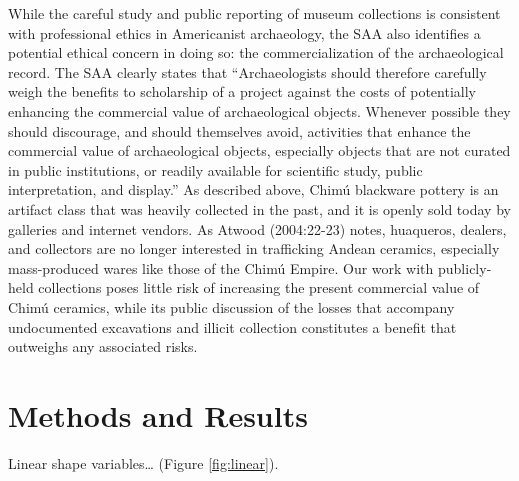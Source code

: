 \documentclass[]{interact}
\theoremstyle{plain}%
\theoremstyle{definition}
\theoremstyle{remark}
\begin{document}
While the careful study and public reporting of museum collections is
consistent with professional ethics in Americanist archaeology, the SAA
also identifies a potential ethical concern in doing so: the
commercialization of the archaeological record. The SAA clearly states
that ``Archaeologists should therefore carefully weigh the benefits to
scholarship of a project against the costs of potentially enhancing the
commercial value of archaeological objects. Whenever possible they
should discourage, and should themselves avoid, activities that enhance
the commercial value of archaeological objects, especially objects that
are not curated in public institutions, or readily available for
scientific study, public interpretation, and display.'' As described
above, Chimú blackware pottery is an artifact class that was heavily
collected in the past, and it is openly sold today by galleries and
internet vendors. As Atwood (2004:22-23) notes, huaqueros, dealers, and
collectors are no longer interested in trafficking Andean ceramics,
especially mass-produced wares like those of the Chimú Empire. Our work
with publicly-held collections poses little risk of increasing the
present commercial value of Chimú ceramics, while its public discussion
of the losses that accompany undocumented excavations and illicit
collection constitutes a benefit that outweighs any associated risks.

\hypertarget{methods-and-results}{%
\section{Methods and Results}\label{methods-and-results}}

Linear shape variables\ldots{} (Figure \ref{fig:linear}).
\end{document}
